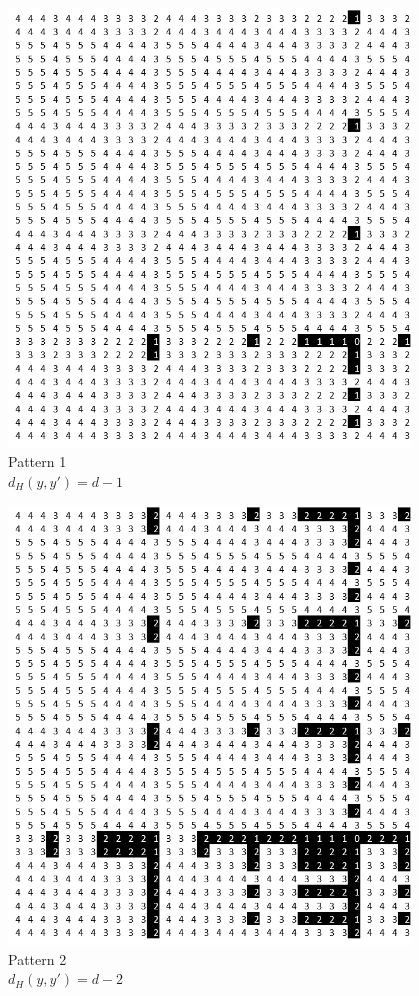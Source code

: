 \documentclass[oneside,12pt]{DISCSthesis}
\begin{document}
{\begin{figure}[h]
			\begin{minipage}{.33\textwidth}\centering\includegraphics[width=0.95\textwidth]{img/1}\\ Pattern 1 \\$d_H(y,y') = d-1$ \end{minipage}
			\begin{minipage}{.33\textwidth}\centering\includegraphics[width=0.95\textwidth]{img/2}\\ Pattern 2 \\$d_H(y,y') = d-2$ \end{minipage}

\end{figure}}
\end{document}
